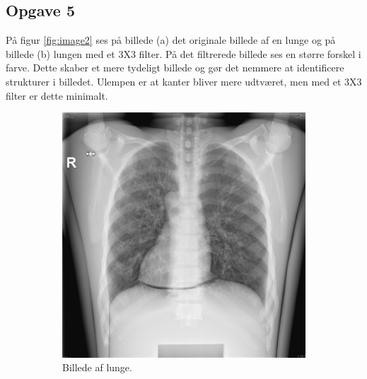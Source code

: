 \documentclass{article}
\begin{document}
\subsection{Opgave 5}
På figur \ref{fig:image2} ses på billede (a) det originale billede af en lunge og på billede (b) lungen med et 3X3 filter. På det filtrerede billede ses en større forskel i farve. Dette skaber et mere tydeligt billede og gør det nemmere at identificere strukturer i billedet.\newline 
Ulempen er at kanter bliver mere udtværet, men med et 3X3 filter er dette minimalt.  
\begin{figure}[H]
  \begin{subfigure}[b]{0.49\textwidth}
    \includegraphics[width=\textwidth]{Image/lung.png}
    \caption{Billede af lunge.}
  \end{subfigure}
  \hfill
  \begin{subfigure}[b]{0.49\textwidth}

\end{subfigure}
\end{figure}
\end{document}
